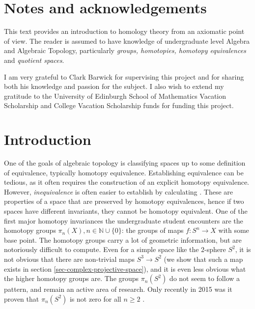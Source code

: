 \section{Notes and acknowledgements}
This text provides an introduction to homology theory from an axiomatic point of view. The reader is assumed to have knowledge of undergraduate level Algebra and Algebraic Topology, particularly \textit{groups, homotopies, homotopy equivalences} and \textit{quotient spaces}.

I am very grateful to Clark Barwick for supervising this project and for sharing both his knowledge and passion for the subject. I also wish to extend my gratitude to the University of Edinburgh School of Mathematics Vacation Scholarship and College Vacation Scholarship funds for funding this project.
\newpage
\section{Introduction}
One of the goals of algebraic topology is classifying spaces up to some definition of equivalence, typically homotopy equivalence. Establishing equivalence can be tedious, as it often requires the construction of an explicit homotopy equivalence. However, \textit{inequivalence} is often easier to establish by calculating . These are properties of a space that are preserved by homotopy equivalences, hence if two spaces have different invariants, they cannot be homotopy equivalent. One of the first major homotopy invariances the undergraduate student encounters are the homotopy groups $\pi_n(X),n\in \mathbb{N}\cup \{0\}$: the groups of maps $f:S^{n}\rightarrow X$ with some base point. The homotopy groups carry a lot of geometric information, but are notoriously difficult to compute. Even for a simple space like the $2$-sphere $S^2$, it is not obvious that there are non-trivial maps $S^3\rightarrow S^2$ (we show that such a map exists in section \ref{sec-complex-projective-space}), and it is even less obvious what the higher homotopy groups are. The groups $\pi_n(S^2)$ do not seem to follow a pattern, and remain an active area of research. Only recently in 2015 was it proven that $\pi_n(S^2)$ is not zero for all $n\geq 2$ \cite{Ivanov}.

